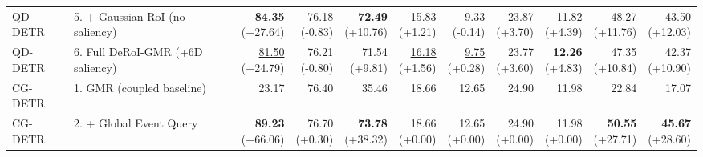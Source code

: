 \documentclass{article}
\begin{document}
{\begin{tabular}{llrrrrrrrrr}
QD-DETR & 5. + Gaussian-RoI (no saliency) & \shortstack{\textbf{84.35} \\ {\scriptsize (+27.64)}} & \shortstack{76.18 \\ {\scriptsize (-0.83)}} & \shortstack{\textbf{72.49} \\ {\scriptsize (+10.76)}} & \shortstack{15.83 \\ {\scriptsize (+1.21)}} & \shortstack{9.33 \\ {\scriptsize (-0.14)}} & \shortstack{\underline{23.87} \\ {\scriptsize (+3.70)}} & \shortstack{\underline{11.82} \\ {\scriptsize (+4.39)}} & \shortstack{\underline{48.27} \\ {\scriptsize (+11.76)}} & \shortstack{\underline{43.50} \\ {\scriptsize (+12.03)}} \\
QD-DETR & 6. Full DeRoI-GMR (+6D saliency) & \shortstack{\underline{81.50} \\ {\scriptsize (+24.79)}} & \shortstack{76.21 \\ {\scriptsize (-0.80)}} & \shortstack{71.54 \\ {\scriptsize (+9.81)}} & \shortstack{\underline{16.18} \\ {\scriptsize (+1.56)}} & \shortstack{\underline{9.75} \\ {\scriptsize (+0.28)}} & \shortstack{23.77 \\ {\scriptsize (+3.60)}} & \shortstack{\textbf{12.26} \\ {\scriptsize (+4.83)}} & \shortstack{47.35 \\ {\scriptsize (+10.84)}} & \shortstack{42.37 \\ {\scriptsize (+10.90)}} \\
\midrule
CG-DETR & 1. GMR (coupled baseline) & 23.17 & 76.40 & 35.46 & 18.66 & 12.65 & 24.90 & 11.98 & 22.84 & 17.07 \\
CG-DETR & 2. + Global Event Query & \shortstack{\textbf{89.23} \\ {\scriptsize (+66.06)}} & \shortstack{76.70 \\ {\scriptsize (+0.30)}} & \shortstack{\textbf{73.78} \\ {\scriptsize (+38.32)}} & \shortstack{18.66 \\ {\scriptsize (+0.00)}} & \shortstack{12.65 \\ {\scriptsize (+0.00)}} & \shortstack{24.90 \\ {\scriptsize (+0.00)}} & \shortstack{11.98 \\ {\scriptsize (+0.00)}} & \shortstack{\textbf{50.55} \\ {\scriptsize (+27.71)}} & \shortstack{\textbf{45.67} \\ {\scriptsize (+28.60)}} \\

\end{tabular}}
\end{document}

